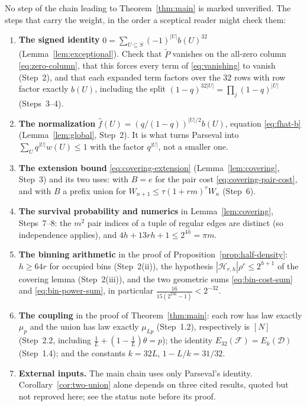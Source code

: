 \documentclass[11pt,letterpaper]{article}
\theoremstyle{definition}
\theoremstyle{remark}
\numberwithin{equation}{section}
\begin{document}
No step of the chain leading to Theorem~\ref{thm:main} is marked
unverified. The steps that carry the weight, in the order a sceptical
reader might check them:

\begin{enumerate}[label=\arabic*.]
\item \textbf{The signed identity}
$0=\sum_{U\subseteq S}(-1)^{|U|}b(U)^{32}$
(Lemma~\ref{lem:exceptional}). Check that $\widetilde P$ vanishes on the
all-zero column \eqref{eq:zero-column}, that this forces every term of
\eqref{eq:vanishing} to vanish (Step~2), and that each expanded term
factors over the $32$ rows with row factor exactly $b(U)$, including the
split $(1-q)^{32|U|}=\prod_j(1-q)^{|U|}$ (Steps~3--4).
\item \textbf{The normalization}
$\widehat f(U)=(q/(1-q))^{|U|/2}b(U)$, equation \eqref{eq:fhat-b}
(Lemma~\ref{lem:global}, Step~2). It is what turns Parseval into
$\sum_Uq^{|U|}w(U)\le1$ with the factor $q^{|U|}$, not a smaller one.
\item \textbf{The extension bound} \eqref{eq:covering-extension}
(Lemma~\ref{lem:covering}, Step~3) and its two uses: with $B=e$ for the
pair cost \eqref{eq:covering-pair-cost}, and with $B$ a prefix union for
$W_{n+1}\le\tau(1+rm)^rW_n$ (Step~6).
\item \textbf{The survival probability and numerics} in
Lemma~\ref{lem:covering}, Steps~7--8: the $m^2$ pair indices of a tuple of
regular edges are distinct (so independence applies), and
$4h+13rh+1\le2^{4h}=\pi m$.
\item \textbf{The binning arithmetic} in the proof of
Proposition~\ref{prop:half-density}: $h\ge64r$ for occupied bins
(Step~2(ii)), the hypothesis $|\mathcal H_{r,h}|\rho^r\le2^{h+1}$ of the
covering lemma (Step~2(iii)), and the two geometric sums
\eqref{eq:bin-cost-sum} and \eqref{eq:bin-power-sum}, in particular
$\frac{16}{15(2^{256}-1)}<2^{-32}$.
\item \textbf{The coupling} in the proof of Theorem~\ref{thm:main}: each
row has law exactly $\mu_p$ and the union has law exactly $\mu_{Lp}$
(Step~1.2), respectively is $[N]$ (Step~2.2, including
$\tfrac1L+(1-\tfrac1L)\theta=p$); the identity
$E_{32}(\mathcal F)=E_k(\mathcal D)$ (Step~1.4); and the constants
$k=32L$, $1-L/k=31/32$.
\item \textbf{External inputs.} The main chain uses only Parseval's
identity. Corollary~\ref{cor:two-union} alone depends on three cited
results, quoted but not reproved here; see the status note before its
proof.
\end{enumerate}
\end{document}
